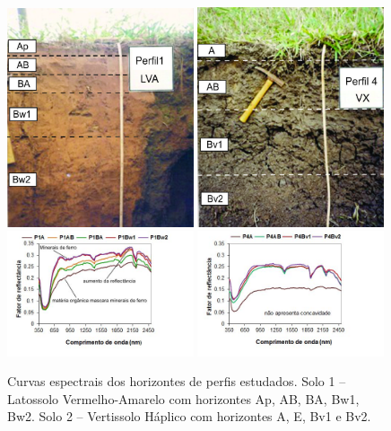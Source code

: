 \begin{figure}[tb!]
\begin{minipage}[t]{1\linewidth}
   \centering
   \includegraphics[width=0.49\textwidth]{figuras/lva.jpg}
   \includegraphics[width=0.49\textwidth]{figuras/vertissolo.jpg}
   \includegraphics[width=0.49\textwidth, trim=0.5cm 0cm 1.5cm 0cm, clip]{figuras/curvas-lva.jpg}
   \includegraphics[width=0.49\textwidth, trim=0.5cm 0cm 1.5cm 0cm, clip]{figuras/curvas-vertissolo.jpg}
   \caption{Curvas espectrais dos horizontes de perfis estudados. Solo 1 -- Latossolo Vermelho-Amarelo com horizontes Ap, AB, BA, Bw1, Bw2. Solo 2 -- Vertissolo Háplico com horizontes A, E, Bv1 e Bv2.}
   \label{fig:curvas}
\end{minipage}
\end{figure}

